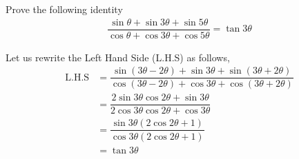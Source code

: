 
\question[3] Prove the following identity
\begin{align}
  \dfrac{\sin\theta + \sin 3\theta + \sin 5\theta}
  	{\cos \theta + \cos 3\theta + \cos 5\theta} = \tan 3\theta \nonumber
\end{align}


\begin{solution}[\halfpage]
  Let us rewrite the Left Hand Side (L.H.S) as follows,
  \begin{align}
    \text{L.H.S} &= \dfrac{\sin(3\theta - 2\theta ) + \sin 3\theta + 
    						\sin (3\theta + 2\theta)}
  						  {\cos (3\theta - 2\theta) + \cos 3\theta + 
  							\cos (3\theta + 2\theta)} \\
				 &= \dfrac{2\sin 3\theta \cos 2\theta + \sin 3\theta}
				  		  {2\cos 3\theta \cos 2\theta + \cos 3\theta} \\
				 &= \dfrac{\sin 3\theta(2\cos 2\theta + 1)}
				  		  {\cos 3\theta(2\cos 2\theta + 1)} \\
				 &= \tan 3\theta
  \end{align}
\end{solution}
